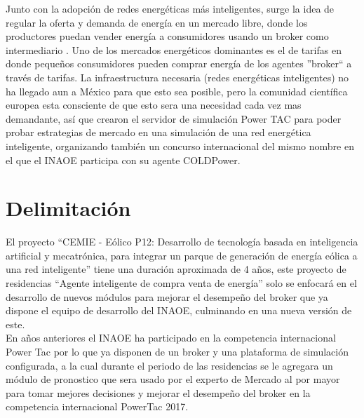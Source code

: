 Junto con la adopción de redes energéticas más inteligentes, surge la idea de regular la oferta y demanda de energía en un mercado libre, donde los productores puedan vender energía a consumidores usando un broker como intermediario \cite{Fixed-priceTariffG2015}. 
Uno de los mercados energéticos dominantes es el de tarifas en donde pequeños consumidores pueden comprar energía de los agentes ''broker`` a través de tarifas.
La infraestructura necesaria (redes energéticas inteligentes) no ha llegado aun a México para que esto sea posible, pero la comunidad científica europea esta consciente de que esto sera una necesidad cada vez mas demandante, así que crearon el servidor de simulación Power TAC para poder probar estrategias de mercado en una simulación de una red energética inteligente, organizando también un concurso internacional del mismo nombre en el que el INAOE participa con su agente COLDPower.

\section{Delimitación}

El proyecto ``CEMIE - Eólico P12: Desarrollo de tecnología basada en inteligencia artificial y mecatrónica, para integrar un parque de generación de energía eólica a una red inteligente'' tiene una duración aproximada de 4 años, este proyecto de residencias ``Agente inteligente de compra venta de energía'' solo se enfocará en el desarrollo de nuevos módulos para mejorar el desempeño del broker que ya dispone el equipo de desarrollo del INAOE, culminando en una nueva versión de este.\\

En años anteriores el INAOE ha participado en la competencia internacional Power Tac por lo que ya disponen de un broker y una plataforma de simulación configurada, a la cual durante el periodo de las residencias se le agregara un módulo de pronostico que sera usado por el experto de Mercado al por mayor para tomar mejores decisiones y mejorar el desempeño del broker en la competencia internacional PowerTac 2017. 